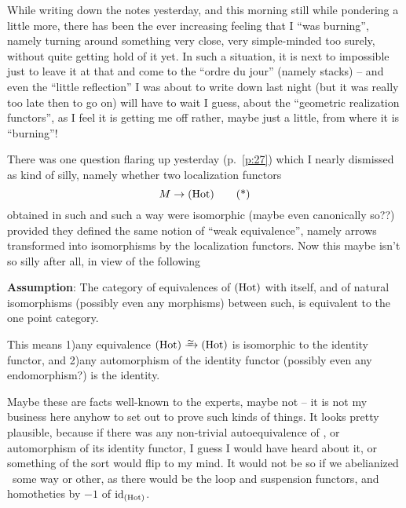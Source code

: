 \bigbreak

\presectionfill{}\par

\label{sec:28}%
While writing down the notes yesterday, and this morning still while
pondering a little more, there has been the ever increasing feeling
that I ``was burning'', namely turning around something very close,
very simple-minded too surely, without quite getting hold of it
yet. In such a situation, it is next to impossible just to leave it at
that and come to the ``ordre du jour'' (namely stacks) -- and even the
``little reflection'' I was about to write down last night (but it was
really too late then to go on) will have to wait I guess, about the
``geometric realization functors'', as I feel it is getting me off
rather, maybe just a little, from where it is ``burning''!

There was one question flaring up yesterday
(p.~\ref{p:27}) which I nearly
dismissed as kind of silly, namely whether two localization functors
\begin{equation}
  \label{eq:28.star}
  M \to {\ensuremath{(\mathrm{Hot})}} \tag{*}
\end{equation}
obtained in such and such a way were isomorphic (maybe even
canonically so??) provided they defined the same notion of ``weak
equivalence'', namely arrows transformed into isomorphisms by the
localization functors. Now this maybe isn't so silly after all, in
view of the following\par
\noindent \textbf{Assumption}: The category of equivalences of ${(\mathrm{Hot})}$
with itself, and of natural isomorphisms (possibly even any morphisms)
between such, is equivalent to the one point category.

This means 1)\enspace any equivalence $\Hot \tosimeq \Hot$ is
isomorphic to the identity functor, and 2)\enspace any automorphism of
the identity functor (possibly even any endomorphism?) is the
identity.

Maybe these are facts well-known to the experts, maybe not -- it is
not my business here anyhow to set out to prove such kinds of
things. It looks pretty plausible, because if there was any
non-trivial autoequivalence of \Hot, or automorphism of its identity
functor, I guess I would have heard about it, or something of the sort
would flip to  my mind. It would not be so if we abelianized \Hot\
some way or other, as there would be the loop and suspension functors,
and homotheties by $-1$ of $\operatorname{id}_{(\mathrm{Hot})}$.

